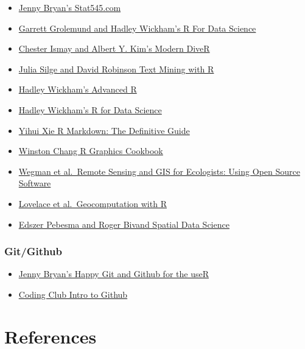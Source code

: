 \documentclass[
  letterpaper,
  DIV=11,
  numbers=noendperiod]{scrreprt}
\providecommand{\tightlist}{%
  \setlength{\itemsep}{0pt}\setlength{\parskip}{0pt}}\usepackage{longtable,booktabs,array}
\begin{document}
\begin{itemize}
\tightlist
\item
  \href{http://stat545.com/}{Jenny Bryan's Stat545.com}
\item
  \href{http://r4ds.had.co.nz/}{Garrett Grolemund and Hadley Wickham's R
  For Data Science}
\item
  \href{https://ismayc.github.io/moderndiver-book/}{Chester Ismay and
  Albert Y. Kim's Modern DiveR}
\item
  \href{http://tidytextmining.com/}{Julia Silge and David Robinson Text
  Mining with R}
\item
  \href{http://adv-r.had.co.nz/}{Hadley Wickham's Advanced R}
\item
  \href{https://r4ds.had.co.nz}{Hadley Wickham's R for Data Science}
\item
  \href{https://bookdown.org/yihui/rmarkdown/}{Yihui Xie R Markdown: The
  Definitive Guide}
\item
  \href{http://www.cookbook-r.com/}{Winston Chang R Graphics Cookbook}
\item
  \href{http://book.ecosens.org/RSEbook/}{Wegman et al.~Remote Sensing
  and GIS for Ecologists: Using Open Source Software}
\item
  \href{https://geocompr.robinlovelace.net/}{Lovelace et
  al.~Geocomputation with R}
\item
  \href{https://keen-swartz-3146c4.netlify.app/index.html}{Edszer
  Pebesma and Roger Bivand Spatial Data Science}
\end{itemize}

\hypertarget{gitgithub}{%
\subsection*{Git/Github}\label{gitgithub}}

\begin{itemize}
\tightlist
\item
  \href{http://happygitwithr.com/}{Jenny Bryan's Happy Git and Github
  for the useR}
\item
  \href{https://ourcodingclub.github.io/2017/02/27/git.html}{Coding Club
  Intro to Github}
\end{itemize}


\hypertarget{references}{%
\chapter*{References}\label{references}}
\end{document}

